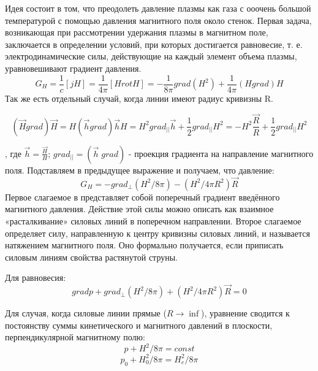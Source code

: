\documentclass[10pt, a4paper]{article}
\numberwithin{equation}{section}
\begin{document}
Идея состоит в том, что преодолеть давление плазмы как газа с ооочень большой температурой с помощью давления магнитного поля около стенок.
Первая задача, возникающая при рассмотрении удержания плазмы в магнитном поле, заключается в определении условий, при которых достигается равновесие, т. е. электродинамические силы, действующие на каждый элемент объема плазмы, уравновешивают градиент давления.
\begin{equation}
	\label{eq.Disp14.1.3}
	G_H=\frac{1}{c} [j H]=\frac{1}{4 \pi} [H rotH]=-\frac{1}{8 \pi} grad(H^{2})+\frac{1}{4 \pi} (H grad) H
\end{equation}
Так же есть отдельный случай, когда линии имеют радиус кривизны R.

\begin{equation}
	\label{eq.Disp14.1.4}
(\vec H grad)\vec H=H(\vec h grad)\vec h H=H^{2} grad_{||}\vec h + \frac{1}{2} grad_{||} H^{2}=-H^{2} \frac{\vec R}{R}+\frac{1}{2} grad_{||} H^{2}
\end{equation}


, где $\vec h= \frac{\vec H}{H}$; $grad_{||}=(\vec h \; grad)$ - проекция градиента на направление магнитного поля. Подставляем в предыдущее выражение и получаем, что давление:
\begin{equation}
	\label{eq.Disp14.1.5}
 G_H=-grad_{\perp}(H^{2}/8\pi)-(H^{2}/4\pi R^{2})\vec R
\end{equation}
Первое слагаемое в представляет собой поперечный градиент введённого магнитного давления. Действие этой силы можно описать как взаимное «расталкивание» силовых линий в поперечном направлении. Второе слагаемое определяет силу, направленную к центру кривизны силовых линий, и называется натяжением магнитного поля. Оно формально получается, если приписать силовым линиям свойства растянутой струны.

Для равновесия: 
\begin{equation}
	\label{eq.Disp14.1.6}
 grad p + grad_{\perp}(H^{2}/8\pi)+(H^{2}/4\pi R^{2})\vec R =0
\end{equation}

Для случая, когда силовые линии прямые ($R\rightarrow \inf $), уравнение сводится к постоянству суммы кинетического и магнитного давлений в плоскости, перпендикулярной магнитному полю:
\begin{equation}
	\label{eq.Disp14.1.7}
p + H^{2}/8\pi=const
\end{equation}
\begin{equation}
	\label{eq.Disp14.1.8}
p_0 + H_{0}^{2}/8\pi=H_{e}^{2}/8\pi
\end{equation}
\end{document}
